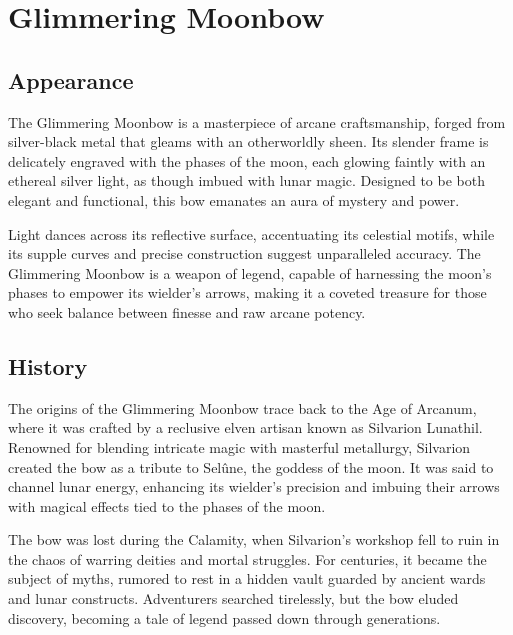
\chapter*{Glimmering Moonbow}

\section*{Appearance}
The Glimmering Moonbow is a masterpiece of arcane craftsmanship, forged from silver-black metal that gleams with an otherworldly sheen. Its slender frame is delicately engraved with the phases of the moon, each glowing faintly with an ethereal silver light, as though imbued with lunar magic. Designed to be both elegant and functional, this bow emanates an aura of mystery and power.

Light dances across its reflective surface, accentuating its celestial motifs, while its supple curves and precise construction suggest unparalleled accuracy. The Glimmering Moonbow is a weapon of legend, capable of harnessing the moon's phases to empower its wielder's arrows, making it a coveted treasure for those who seek balance between finesse and raw arcane potency.

\section*{History}
The origins of the Glimmering Moonbow trace back to the Age of Arcanum, where it was crafted by a reclusive elven artisan known as Silvarion Lunathil. Renowned for blending intricate magic with masterful metallurgy, Silvarion created the bow as a tribute to Selûne, the goddess of the moon. It was said to channel lunar energy, enhancing its wielder's precision and imbuing their arrows with magical effects tied to the phases of the moon.

The bow was lost during the Calamity, when Silvarion's workshop fell to ruin in the chaos of warring deities and mortal struggles. For centuries, it became the subject of myths, rumored to rest in a hidden vault guarded by ancient wards and lunar constructs. Adventurers searched tirelessly, but the bow eluded discovery, becoming a tale of legend passed down through generations.

